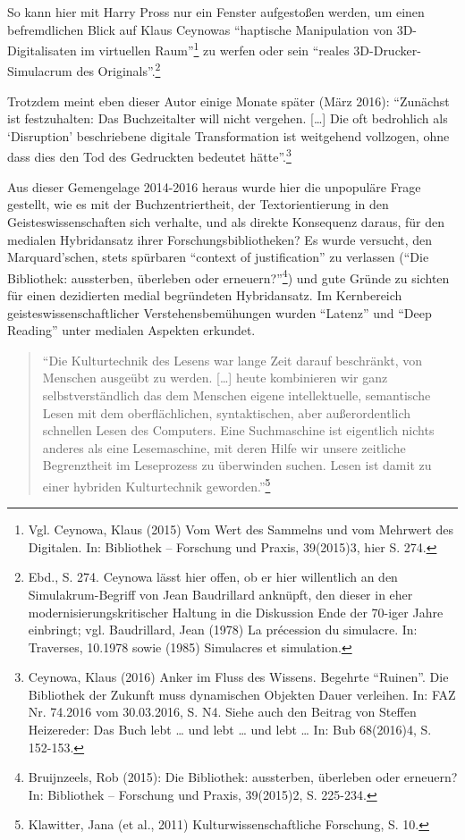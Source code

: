 \documentclass[a4paper,
fontsize=11pt,
oneside,
numbers=noperiodatend,
parskip=half-,
bibliography=totoc,
final
]{scrartcl}
\begin{document}
So kann hier mit Harry Pross nur ein Fenster aufgestoßen werden, um
einen befremdlichen Blick auf Klaus Ceynowas \enquote{haptische
Manipulation von 3D-Digitalisaten im virtuellen Raum}\footnote{Vgl.
  Ceynowa, Klaus (2015) Vom Wert des Sammelns und vom Mehrwert des
  Digitalen. In: Bibliothek -- Forschung und Praxis, 39(2015)3, hier S.
  274.} zu werfen oder sein \enquote{reales 3D-Drucker-Simulacrum des
Originals}.\footnote{Ebd., S. 274. Ceynowa lässt hier offen, ob er hier
  willentlich an den Simulakrum-Begriff von Jean Baudrillard anknüpft,
  den dieser in eher modernisierungskritischer Haltung in die Diskussion
  Ende der 70-iger Jahre einbringt; vgl. Baudrillard, Jean (1978) La
  précession du simulacre. In: Traverses, 10.1978 sowie (1985)
  Simulacres et simulation.}

Trotzdem meint eben dieser Autor einige Monate später (März 2016):
\enquote{Zunächst ist festzuhalten: Das Buchzeitalter will nicht
vergehen. {[}\ldots{}{]} Die oft bedrohlich als \enquote{Disruption}
beschriebene digitale Transformation ist weitgehend vollzogen, ohne dass
dies den Tod des Gedruckten bedeutet hätte}.\footnote{Ceynowa, Klaus
  (2016) Anker im Fluss des Wissens. Begehrte \enquote{Ruinen}. Die
  Bibliothek der Zukunft muss dynamischen Objekten Dauer verleihen. In:
  FAZ Nr. 74.2016 vom 30.03.2016, S. N4. Siehe auch den Beitrag von
  Steffen Heizereder: Das Buch lebt \ldots{} und lebt \ldots{} und lebt
  \ldots{} In: Bub 68(2016)4, S. 152-153.}

Aus dieser Gemengelage 2014-2016 heraus wurde hier die unpopuläre Frage
gestellt, wie es mit der Buchzentriertheit, der Textorientierung in den
Geisteswissenschaften sich verhalte, und als direkte Konsequenz daraus,
für den medialen Hybridansatz ihrer Forschungsbibliotheken? Es wurde
versucht, den Marquard'schen, stets spürbaren \enquote{context of
justification} zu verlassen (\enquote{Die Bibliothek: aussterben,
überleben oder erneuern?}\footnote{Bruijnzeels, Rob (2015): Die
  Bibliothek: aussterben, überleben oder erneuern? In: Bibliothek --
  Forschung und Praxis, 39(2015)2, S. 225-234.}) und gute Gründe zu
sichten für einen dezidierten medial begründeten Hybridansatz. Im
Kernbereich geisteswissenschaftlicher Verstehensbemühungen wurden
\enquote{Latenz} und \enquote{Deep Reading} unter medialen Aspekten
erkundet.

\begin{quote}
\enquote{Die Kulturtechnik des Lesens war lange Zeit darauf beschränkt,
von Menschen ausgeübt zu werden. {[}\ldots{}{]} heute kombinieren wir
ganz selbstverständlich das dem Menschen eigene intellektuelle,
semantische Lesen mit dem oberflächlichen, syntaktischen, aber
außerordentlich schnellen Lesen des Computers. Eine Suchmaschine ist
eigentlich nichts anderes als eine Lesemaschine, mit deren Hilfe wir
unsere zeitliche Begrenztheit im Leseprozess zu überwinden suchen. Lesen
ist damit zu einer hybriden Kulturtechnik geworden.}\footnote{Klawitter,
  Jana (et al., 2011) Kulturwissenschaftliche Forschung, S. 10.}
\end{quote}
\end{document}
